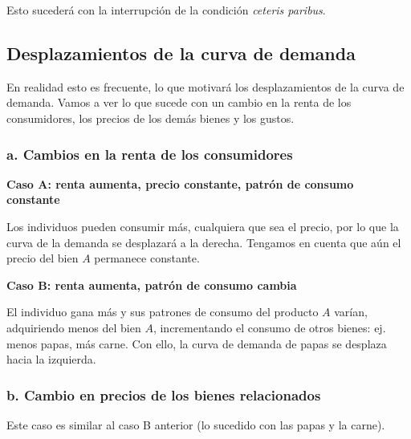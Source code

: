 Esto sucederá con la interrupción de la condición \textit{ceteris paribus}.

\subsection{Desplazamientos de la curva de demanda}

En realidad esto es frecuente,
lo que motivará los desplazamientos de la curva de demanda.
Vamos a ver lo que sucede con un cambio en la renta de los consumidores,
los precios de los demás bienes y los gustos.

\subsubsection{a. Cambios en la renta de los consumidores}

\textbf{Caso A: renta aumenta, precio constante, patrón de consumo constante}

Los individuos pueden consumir más,
cualquiera que sea el precio,
por lo que la curva de la demanda se desplazará a la derecha.
Tengamos en cuenta que aún el precio del bien \(A\)
permanece constante.

\begin{center}
\end{center}

\textbf{Caso B: renta aumenta, patrón de consumo cambia}

El individuo gana más y sus patrones de consumo del producto \(A\) varían,
adquiriendo menos del bien \(A\),
incrementando el consumo de otros bienes:
ej. menos papas, más carne.
Con ello, la curva de demanda de papas se desplaza hacia la izquierda.

\subsubsection{b. Cambio en precios de los bienes relacionados}

Este caso es similar al caso B anterior
(lo sucedido con las papas y la carne).

